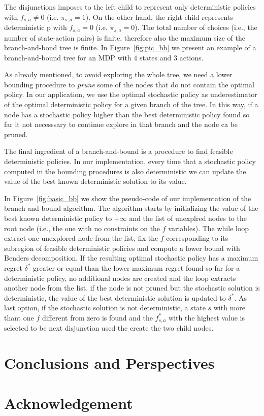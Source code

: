 \documentclass[runningheads,a4paper]{llncs}
\begin{document}
The disjunctions imposes to the left child to represent only deterministic policies with $f_{s,a}\neq 0 $  (i.e. $\pi_{s,a}=1$). On the other hand, the right child represents deterministic p with $f_{s,a}=0$  (i.e. $\pi_{s,a}=0$).
The total number of choices (i.e., the number of state-action pairs) is finite, therefore also the maximum size of the branch-and-bond tree is finite. In Figure~\ref{fig:pic_bb} we present an example of a branch-and-bound tree for an MDP with $4$ states and $3$ actions. 
 
\begin{center}
 
\end{center}

As already mentioned, to avoid exploring the whole tree, we need a lower bounding procedure to \textit{prune} some of the nodes that do not contain the optimal policy. In our application, we use the optimal stochastic policy as underestimator of the optimal deterministic policy for a given branch of the tree. In this way, if a node has a stochastic policy higher than the best deterministic policy found so far it not necesssary to continue explore in that branch and the node ca be pruned.

The final ingredient of a branch-and-bound is a procedure to find feasible deterministic policies. In our implementation, every time that a stochastic policy computed in the bounding procedures is also deterministic we can update the value of the best known deterministic solution to its value.




In Figure~\ref{fig:basic_bb} we show the pseudo-code of our implementation of the branch-and-bound algorithm. The algorithm starts by initializing the value of the best known deterministic policy to $+\infty$ and the list of unexplred nodes to the root node (i.e., the one with no constraints on the $f$ variables).
The while loop extract one unexplored node from the list, fix the $f$ corresponding to its subregion of feasible deterministic policies and compute a lower bound with Benders decomposition. If the resulting optimal stochastic policy has a maximum regret $\delta^*$ greater or equal than the lower maximum regret found so far for a deterministic policy, no additional nodes are created and the loop extracts another node from the list. if the node is not pruned but the stochastic solution is deterministic, the value of the best deterministic solution is updated to $\delta^*$. As last option, if the stochastic solution is not deterministic, a state $s$ with more thant one $f$ different from zero is found and the $f^*_{s,a}$ with the highest value is selected to be next disjunction used the create the two child nodes.






 
\section{Conclusions and Perspectives}
		


\section*{Acknowledgement}



\end{document}
